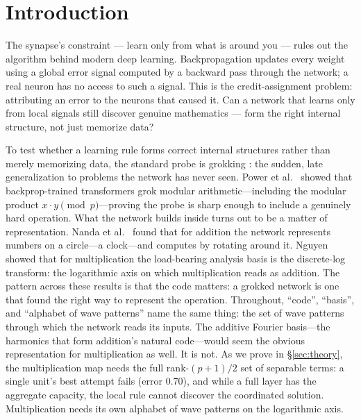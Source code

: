 \documentclass[11pt]{article}
\begin{document}
\tableofcontents

\section{Introduction}\label{sec:intro}
The synapse's constraint --- learn only from what is around you --- rules out the algorithm behind modern deep learning. Backpropagation updates every weight using a global error signal computed by a backward pass through the network; a real neuron has no access to such a signal. This is the credit-assignment problem: attributing an error to the neurons that caused it. Can a network that learns only from local signals still discover genuine mathematics --- form the right internal structure, not just memorize data?

To test whether a learning rule forms correct internal structures rather than merely memorizing data, the standard probe is grokking \cite{power2022}: the sudden, late generalization to problems the network has never seen. Power et al.~\cite{power2022} showed that backprop-trained transformers grok modular arithmetic---including the modular product $x\cdot y \pmod{p}$---proving the probe is sharp enough to include a genuinely hard operation. What the network builds inside turns out to be a matter of representation. Nanda et al.~\cite{nanda2023} found that for addition the network represents numbers on a circle---a clock---and computes by rotating around it. Nguyen~\cite{nguyen2026} showed that for multiplication the load-bearing analysis basis is the discrete-log transform: the logarithmic axis on which multiplication reads as addition. The pattern across these results is that the code matters: a grokked network is one that found the right way to represent the operation. Throughout, ``code'', ``basis'', and ``alphabet of wave patterns'' name the same thing: the set of wave patterns through which the network reads its inputs. The additive Fourier basis---the harmonics that form addition's natural code---would seem the obvious representation for multiplication as well. It is not. As we prove in \S\ref{sec:theory}, the multiplication map needs the full rank-$(p+1)/2$ set of separable terms: a single unit's best attempt fails (error 0.70), and while a full layer has the aggregate capacity, the local rule cannot discover the coordinated solution. Multiplication needs its own alphabet of wave patterns on the logarithmic axis.
\end{document}
